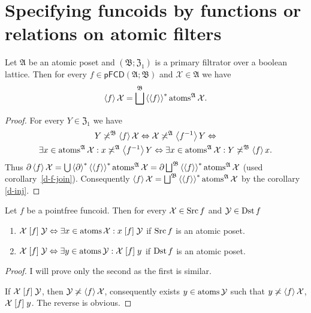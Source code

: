 \section{Specifying funcoids by functions or relations on atomic filters}
\begin{thm}
\label{spfn-atoms}Let $\mathfrak{A}$ be an atomic poset and $(\mathfrak{B};\mathfrak{Z}_{1})$
is a primary filtrator over a boolean lattice. Then for every $f\in\mathsf{pFCD}(\mathfrak{A};\mathfrak{B})$
and $\mathcal{X}\in\mathfrak{A}$ we have
\[
\left\langle f\right\rangle\mathcal{X}=\bigsqcup^{\mathfrak{B}}\left\langle \left\langle f\right\rangle\right\rangle ^{\ast}\operatorname{atoms}^{\mathfrak{A}}\mathcal{X}.
\]
\end{thm}
\begin{proof}
For every $Y\in\mathfrak{Z}_{1}$ we have
\begin{multline*}
Y\not\asymp^{\mathfrak{B}}\left\langle f\right\rangle\mathcal{X}\Leftrightarrow\mathcal{X}\not\asymp^{\mathfrak{A}}\left\langle f^{-1}\right\rangle Y\Leftrightarrow\\
\exists x\in\operatorname{atoms}^{\mathfrak{A}}\mathcal{X}:x\not\asymp^{\mathfrak{A}}\left\langle f^{-1}\right\rangle Y\Leftrightarrow\exists x\in\operatorname{atoms}^{\mathfrak{A}}\mathcal{X}:Y\not\asymp^{\mathfrak{B}}\left\langle f\right\rangle x.
\end{multline*}
Thus $\partial\left\langle f\right\rangle\mathcal{X}=\bigcup\left\langle \partial\right\rangle ^{\ast}\left\langle \left\langle f\right\rangle\right\rangle ^{\ast}\operatorname{atoms}^{\mathfrak{A}}\mathcal{X}=\partial\bigsqcup^{\mathfrak{B}}\left\langle \left\langle f\right\rangle\right\rangle ^{\ast}\operatorname{atoms}^{\mathfrak{A}}\mathcal{X}$
(used corollary~\ref{d-f-join}). Consequently $\left\langle f\right\rangle\mathcal{X}=\bigsqcup^{\mathfrak{B}}\left\langle \left\langle f\right\rangle\right\rangle ^{\ast}\operatorname{atoms}^{\mathfrak{A}}\mathcal{X}$
by the corollary \ref{d-inj}.\end{proof}
\begin{prop}
Let $f$ be a pointfree funcoid. Then for every $\mathcal{X}\in\operatorname{Src} f$
and $\mathcal{Y}\in\operatorname{Dst} f$
\begin{enumerate}
\item $\mathcal{X}\mathrel{\left[f\right]}\mathcal{Y}\Leftrightarrow\exists x\in\operatorname{atoms}\mathcal{X}:x\mathrel{\left[f\right]}\mathcal{Y}$
if $\operatorname{Src} f$ is an atomic poset.
\item $\mathcal{X}\mathrel{\left[f\right]}\mathcal{Y}\Leftrightarrow\exists y\in\operatorname{atoms}\mathcal{Y}:\mathcal{X}\mathrel{\left[f\right]}y$
if $\operatorname{Dst} f$ is an atomic poset.
\end{enumerate}
\end{prop}
\begin{proof}
I will prove only the second as the first is similar.

If $\mathcal{X}\mathrel{\left[f\right]}\mathcal{Y}$, then $\mathcal{Y}\not\asymp\left\langle f\right\rangle\mathcal{X}$,
consequently exists $y\in\operatorname{atoms}\mathcal{Y}$ such that $y\not\asymp\left\langle f\right\rangle\mathcal{X}$,
$\mathcal{X}\mathrel{\left[f\right]}y$. The reverse is obvious.\end{proof}
